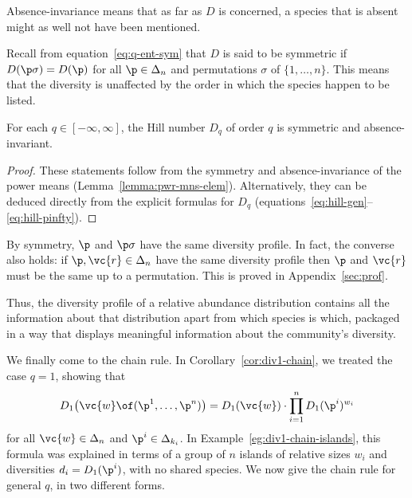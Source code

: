 Absence-invariance means that as far as $D$ is concerned, a species that
is absent might as well not have been mentioned.  

Recall from equation~\eqref{eq:q-ent-sym} that $D$ is said to be
symmetric if $D(\p\sigma) = D(\p)$ for all $\p \in \Delta_n$ and
permutations $\sigma$ of $\{1, \ldots, n\}$.  This means that the
diversity is unaffected by the order in which the species happen to be
listed.

\begin{lemma}
% 
For each $q \in [-\infty, \infty]$, the Hill number $D_q$ of order $q$ is
symmetric and absence-invariant.
\end{lemma}

\begin{proof}
These statements follow from the symmetry and absence-invariance of the
power means (Lemma~\ref{lemma:pwr-mns-elem}).  Alternatively, they can be
deduced directly from the explicit formulas for $D_q$
(equations~\eqref{eq:hill-gen}--\eqref{eq:hill-pinfty}).
\end{proof}

\begin{remark}
% 
By symmetry, $\p$ and $\p\sigma$ have the same diversity profile.  In fact,
the converse also holds: if $\p, \vc{r} \in \Delta_n$ have the same
diversity profile then $\p$ and $\vc{r}$ must be the same up to a
permutation.  This is proved in Appendix~\ref{sec:prof}.

Thus, the diversity profile of a relative abundance distribution contains
all the information about that distribution apart from which species is
which, packaged in a way that displays meaningful information about the
community's diversity.
\end{remark}

We finally come to the chain rule.  In Corollary~\ref{cor:div1-chain}, we
treated the case $q = 1$, showing that
\[
D_1\bigl(\vc{w} \of (\p^1, \ldots, \p^n)\bigr)
=
D_1(\vc{w}) \cdot \prod_{i = 1}^n D_1(\p^i)^{w_i}
\]
for all $\vc{w} \in \Delta_n$ and $\p^i \in \Delta_{k_i}$.  In
Example~\ref{eg:div1-chain-islands}, this formula was explained in terms of
a group of $n$ islands of relative sizes $w_i$ and diversities $d_i =
D_1(\p^i)$, with no shared species.  We now give the chain rule for general
$q$, in two different forms.

